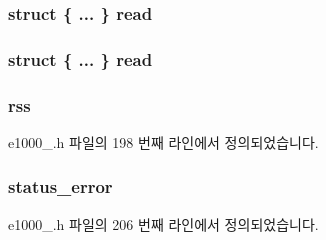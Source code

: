 \subsubsection[{\texorpdfstring{read}{read}}]{\setlength{\rightskip}{0pt plus 5cm}struct \{ ... \}   read}\hypertarget{unione1000__adv__rx__desc_a749e71ccb083af11bad0fec38094928e}{}\label{unione1000__adv__rx__desc_a749e71ccb083af11bad0fec38094928e}
\subsubsection[{\texorpdfstring{read}{read}}]{\setlength{\rightskip}{0pt plus 5cm}struct \{ ... \}   read}\hypertarget{unione1000__adv__rx__desc_aa0a760ee402557bd08632076a470e9aa}{}\label{unione1000__adv__rx__desc_aa0a760ee402557bd08632076a470e9aa}
\subsubsection[{\texorpdfstring{rss}{rss}}]{ rss}\hypertarget{unione1000__adv__rx__desc_a3d5fb33e0fed8eeee1df87a57909d0f8}{}\label{unione1000__adv__rx__desc_a3d5fb33e0fed8eeee1df87a57909d0f8}


e1000\+\_.\+h 파일의 198 번째 라인에서 정의되었습니다.

\subsubsection[{\texorpdfstring{status\+\_\+error}{status_error}}]{ status\+\_\+error}\hypertarget{unione1000__adv__rx__desc_ab4271561fae887e3f61219aadc02685b}{}\label{unione1000__adv__rx__desc_ab4271561fae887e3f61219aadc02685b}


e1000\+\_.\+h 파일의 206 번째 라인에서 정의되었습니다.

